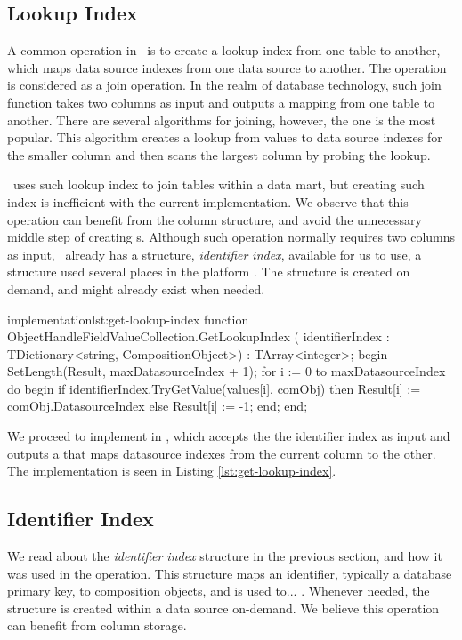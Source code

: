 \subsection{Lookup Index}
\label{sub:Lookup Index}
A common operation in \bd~is to create a lookup index from one table to another, which maps data source indexes from one data source to another. The operation is considered as a join operation. In the realm of database technology, such join function takes two columns as input and outputs a mapping from one table to another. There are several algorithms for joining, however, the  one is the most popular. This algorithm creates a lookup from values to data source indexes for the smaller column and then scans the largest column by probing the lookup.  

\gd~uses such lookup index to join tables within a data mart, but creating such index is inefficient with the current implementation. We observe that this operation can benefit from the column structure, and avoid the unnecessary middle step of creating s. Although such operation normally requires two columns as input, \gap~already has a structure, \textit{identifier index}, available for us to use, a structure used several places in the platform . The structure is created on demand, and might already exist when needed.

\begin{delphicode}{ implementation}{lst:get-lookup-index}
function ObjectHandleFieldValueCollection.GetLookupIndex
( identifierIndex : TDictionary<string, CompositionObject>)
: TArray<integer>;
begin
  SetLength(Result, maxDatasourceIndex + 1);
  for i := 0 to maxDatasourceIndex do
  begin
    if identifierIndex.TryGetValue(values[i], comObj) then
      Result[i] := comObj.DatasourceIndex
    else
      Result[i] := -1;
  end;
end;
\end{delphicode}
We proceed to implement  in , which accepts the the identifier index as input and outputs a  that maps datasource indexes from the current column to the other. The implementation is seen in Listing \ref{lst:get-lookup-index}.  

\subsection{Identifier Index}
\label{sub:Identifier Index}
We read about the \textit{identifier index} structure in the previous section, and how it was used in the  operation. This structure maps an identifier, typically a database primary key, to composition objects, and is used to... . Whenever needed, the structure is created within a data source on-demand. We believe this operation can benefit from column storage.

